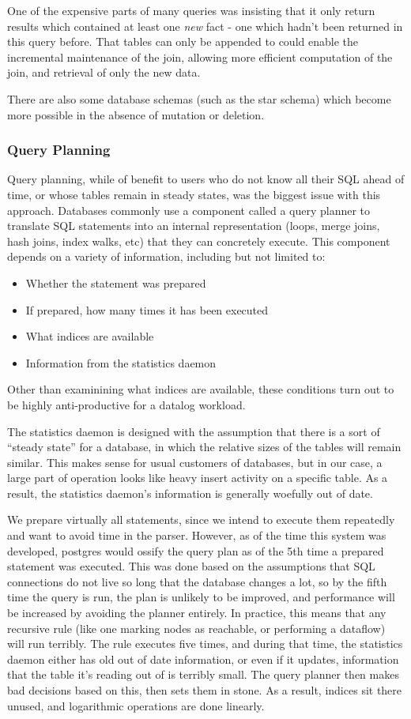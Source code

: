 One of the expensive parts of many queries was insisting that it only return results which contained at least one \emph{new} fact - one which hadn't been returned in this query before.
That tables can only be appended to could enable the incremental maintenance of the join, allowing more efficient computation of the join, and retrieval of only the new data.

There are also some database schemas (such as the star schema) which become more possible in the absence of mutation or deletion.
\subsubsection{Query Planning}
Query planning, while of benefit to users who do not know all their SQL ahead of time, or whose tables remain in steady states, was the biggest issue with this approach.
Databases commonly use a component called a query planner to translate SQL statements into an internal representation (loops, merge joins, hash joins, index walks, etc) that they can concretely execute.
This component depends on a variety of information, including but not limited to:
\begin{itemize}
	\item Whether the statement was prepared
	\item If prepared, how many times it has been executed
	\item What indices are available
	\item Information from the statistics daemon
\end{itemize}
Other than examinining what indices are available, these conditions turn out to be highly anti-productive for a datalog workload.

The statistics daemon is designed with the assumption that there is a sort of ``steady state'' for a database, in which the relative sizes of the tables will remain similar.
This makes sense for usual customers of databases, but in our case, a large part of operation looks like heavy insert activity on a specific table.
As a result, the statistics daemon's information is generally woefully out of date.

We prepare virtually all statements, since we intend to execute them repeatedly and want to avoid time in the parser.
However, as of the time this system was developed, postgres would ossify the query plan as of the 5th time a prepared statement was executed.
This was done based on the assumptions that SQL connections do not live so long that the database changes a lot, so by the fifth time the query is run, the plan is unlikely to be improved, and performance will be increased by avoiding the planner entirely.
In practice, this means that any recursive rule (like one marking nodes as reachable, or performing a dataflow) will run terribly.
The rule executes five times, and during that time, the statistics daemon either has old out of date information, or even if it updates, information that the table it's reading out of is terribly small.
The query planner then makes bad decisions based on this, then sets them in stone.
As a result, indices sit there unused, and logarithmic operations are done linearly.

